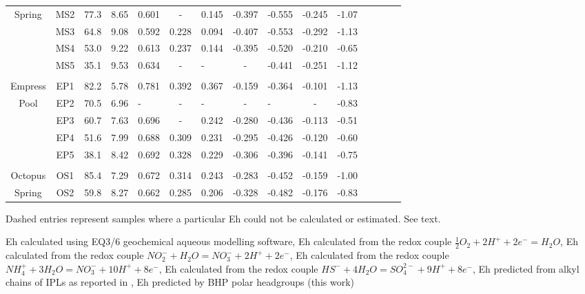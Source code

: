 \begin{landscape}
\begin{table}
\begin{adjustbox}{width=600pt,keepaspectratio}
\begin{threeparttable}
\begin{tabular}{ccccececececccc}
Spring & MS2   & 77.3  & 8.65  & 0.601 & -     & 0.145 & -0.397 & -0.555 & -0.245 & -1.07 \\
      & MS3   & 64.8  & 9.08  & 0.592 & 0.228 & 0.094 & -0.407 & -0.553 & -0.292 & -1.13 \\
      & MS4   & 53.0  & 9.22  & 0.613 & 0.237 & 0.144 & -0.395 & -0.520 & -0.210 & -0.65 \\
      & MS5   & 35.1  & 9.53  & 0.634 & -     & -     & -     & -0.441 & -0.251 & -1.12 \\
      &       &       &       &       &       &       &       &       &       &  \\
Empress & EP1   & 82.2  & 5.78  & 0.781 & 0.392 & 0.367 & -0.159 & -0.364 & -0.101 & -1.13 \\
Pool  & EP2   & 70.5  & 6.96  & -     & -     & -     & -     & -     & -     & -0.83 \\
      & EP3   & 60.7  & 7.63  & 0.696 & -     & 0.242 & -0.280 & -0.436 & -0.113 & -0.51 \\
      & EP4   & 51.6  & 7.99  & 0.688 & 0.309 & 0.231 & -0.295 & -0.426 & -0.120 & -0.60 \\
      & EP5   & 38.1  & 8.42  & 0.692 & 0.328 & 0.229 & -0.306 & -0.396 & -0.141 & -0.75 \\
      &       &       &       &       &       &       &       &       &       &  \\
Octopus & OS1   & 85.4  & 7.29  & 0.672 & 0.314 & 0.243 & -0.283 & -0.452 & -0.159 & -1.00 \\
Spring & OS2   & 59.8  & 8.27  & 0.662 & 0.285 & 0.206 & -0.328 & -0.482 & -0.176 & -0.83 \\
\bottomrule
\end{tabular}%




  \begin{tablenotes}
    Dashed entries represent samples where a particular Eh could not be calculated or estimated. See text.
    
     Eh calculated using EQ3/6 geochemical aqueous modelling software,
     Eh calculated from the redox couple $\frac{1}{2}O_{2} + 2H^{+} + 2e^{-} = H_{2}O$,
     Eh calculated from the redox couple $NO_{2}^{-} + H_{2}O = NO_{3}^{-}+ 2H^{+} + 2e^{-}$,
     Eh calculated from the redox couple $NH_{4}^{+} + 3H_{2}O = NO_{3}^{-}+ 10H^{+} + 8e^{-}$,
     Eh calculated from the redox couple $HS^{-} + 4H_{2}O = SO_{4}^{2-}+ 9H^{+} + 8e^{-}$,
     Eh predicted from alkyl chains of IPLs as reported in \cite{boyer2018thermodynamic},
     Eh predicted by BHP polar headgroups (this work)



\end{tablenotes}
\end{threeparttable}
\end{adjustbox}
\end{table}
\end{landscape}
